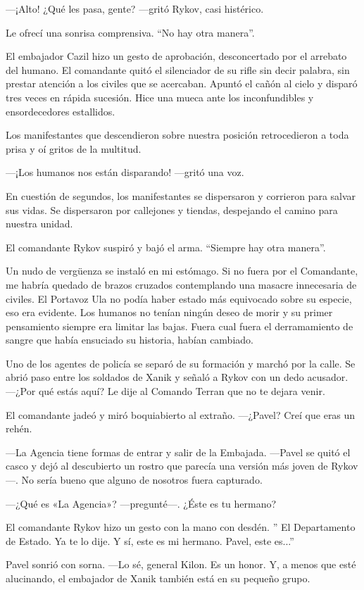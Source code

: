 —¡Alto! ¿Qué les pasa, gente? —gritó Rykov, casi histérico.

Le ofrecí una sonrisa comprensiva. ``No hay otra manera''.

El embajador Cazil hizo un gesto de aprobación, desconcertado por el arrebato del humano. El comandante quitó el silenciador de su rifle sin decir palabra, sin prestar atención a los civiles que se acercaban. Apuntó el cañón al cielo y disparó tres veces en rápida sucesión. Hice una mueca ante los inconfundibles y ensordecedores estallidos.

Los manifestantes que descendieron sobre nuestra posición retrocedieron a toda prisa y oí gritos de la multitud.

—¡Los humanos nos están disparando! —gritó una voz.

En cuestión de segundos, los manifestantes se dispersaron y corrieron para salvar sus vidas. Se dispersaron por callejones y tiendas, despejando el camino para nuestra unidad.

El comandante Rykov suspiró y bajó el arma. ``Siempre hay otra manera''.

Un nudo de vergüenza se instaló en mi estómago. Si no fuera por el Comandante, me habría quedado de brazos cruzados contemplando una masacre innecesaria de civiles. El Portavoz Ula no podía haber estado más equivocado sobre su especie, eso era evidente. Los humanos no tenían ningún deseo de morir y su primer pensamiento siempre era limitar las bajas. Fuera cual fuera el derramamiento de sangre que había ensuciado su historia, habían cambiado.

Uno de los agentes de policía se separó de su formación y marchó por la calle. Se abrió paso entre los soldados de Xanik y señaló a Rykov con un dedo acusador. —¿Por qué estás aquí? Le dije al Comando Terran que no te dejara venir.

El comandante jadeó y miró boquiabierto al extraño. —¿Pavel? Creí que eras un rehén.

—La Agencia tiene formas de entrar y salir de la Embajada. —Pavel se quitó el casco y dejó al descubierto un rostro que parecía una versión más joven de Rykov—. No sería bueno que alguno de nosotros fuera capturado.

—¿Qué es «La Agencia»? —pregunté—. ¿Éste es tu hermano?

El comandante Rykov hizo un gesto con la mano con desdén. ''
El Departamento de Estado. Ya te lo dije. Y sí, este es mi hermano. Pavel, este es...''


Pavel sonrió con sorna. —Lo sé, general Kilon. Es un honor. Y, a menos que esté alucinando, el embajador de Xanik también está en su pequeño grupo.


